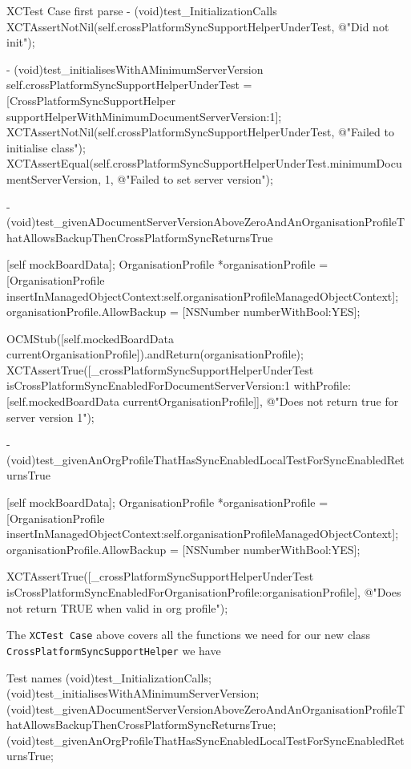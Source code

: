 \documentclass[a4paper, titlepage]{article}
\begin{document}
  \begin{listbox}{1}{XCTest Case first parse}
      - (void)test_InitializationCalls
      {
          XCTAssertNotNil(self.crossPlatformSyncSupportHelperUnderTest, @"Did not init");
      }

      - (void)test_initialisesWithAMinimumServerVersion
      {
          self.crossPlatformSyncSupportHelperUnderTest = [CrossPlatformSyncSupportHelper supportHelperWithMinimumDocumentServerVersion:1];
          XCTAssertNotNil(self.crossPlatformSyncSupportHelperUnderTest, @"Failed to initialise class");
          XCTAssertEqual(self.crossPlatformSyncSupportHelperUnderTest.minimumDocumentServerVersion, 1, @"Failed to set server version");
      }

      - (void)test_givenADocumentServerVersionAboveZeroAndAnOrganisationProfileThatAllowsBackupThenCrossPlatformSyncReturnsTrue
      {
          [self mockBoardData];
          OrganisationProfile *organisationProfile = [OrganisationProfile insertInManagedObjectContext:self.organisationProfileManagedObjectContext];
          organisationProfile.AllowBackup = [NSNumber numberWithBool:YES];

          OCMStub([self.mockedBoardData currentOrganisationProfile]).andReturn(organisationProfile);
          XCTAssertTrue([_crossPlatformSyncSupportHelperUnderTest
          isCrossPlatformSyncEnabledForDocumentServerVersion:1
          withProfile: [self.mockedBoardData currentOrganisationProfile]], @"Does not return true for server version 1");
      }

      - (void)test_givenAnOrgProfileThatHasSyncEnabledLocalTestForSyncEnabledReturnsTrue
      {
          [self mockBoardData];
          OrganisationProfile *organisationProfile = [OrganisationProfile insertInManagedObjectContext:self.organisationProfileManagedObjectContext];
          organisationProfile.AllowBackup = [NSNumber numberWithBool:YES];

          XCTAssertTrue([_crossPlatformSyncSupportHelperUnderTest isCrossPlatformSyncEnabledForOrganisationProfile:organisationProfile], @"Does not return TRUE when valid in org profile");
      }
  \end{listbox}

  The \texttt{XCTest Case} above covers all the functions we
  need for our new class 
  \texttt{CrossPlatformSyncSupportHelper} we have

    \begin{listbox}{1}{Test names}
       (void)test_InitializationCalls;
       (void)test_initialisesWithAMinimumServerVersion;
       (void)test_givenADocumentServerVersionAboveZeroAndAnOrganisationProfileThatAllowsBackupThenCrossPlatformSyncReturnsTrue;
      (void)test_givenAnOrgProfileThatHasSyncEnabledLocalTestForSyncEnabledReturnsTrue;
  \end{listbox}
\end{document}
